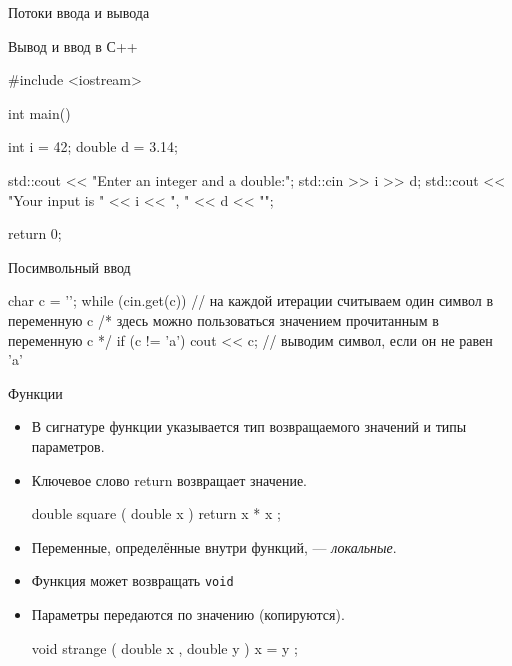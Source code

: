 \documentclass[9pt]{beamer}
\begin{document}
\begin{frame}[fragile]{Потоки ввода и вывода}
      
    Вывод и ввод в С++ 
    \begin{cppcode}
        #include <iostream>
        
        int main()
        {
            int i = 42;
            double d = 3.14;
            
            std::cout << "Enter an integer and a double:\n";
            std::cin >> i >> d;
            std::cout << "Your input is " << i << ", " << d << "\n";
            
            return 0;
        }
    \end{cppcode}   
\end{frame}

\begin{frame}[fragile]{Посимвольный ввод}
    \begin{cppcode}
        char c = '\0';
        while (cin.get(c)) { // на каждой итерации считываем один символ в переменную c
            /* здесь можно пользоваться значением прочитанным в переменную c */
            if (c != 'a')
            cout << c; // выводим символ, если он не равен 'a'
        }
    \end{cppcode}   
\end{frame}

\begin{frame}[fragile]{Функции}
    \begin{itemize}
        \item В сигнатуре функции указывается тип возвращаемого
        значений и типы параметров.
        \item Ключевое слово return возвращает значение.

        \begin{cppcode}
            double square ( double x ) {
                return x * x ;
            }

        \end{cppcode}
        \item Переменные, определённые внутри функций, — \emph{локальные}.
        \item Функция может возвращать \texttt{void}
        \item Параметры передаются по значению (копируются).
        \begin{cppcode}
            void strange ( double x , double y ) {
                x = y ;
            }

        \end{cppcode}
    \end{itemize}
\end{frame}
\end{document}
